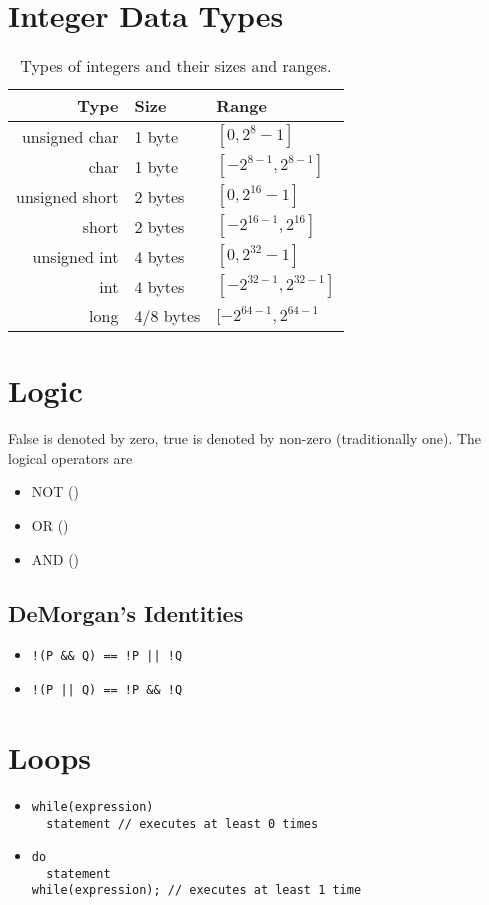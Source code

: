 \documentclass[12pt]{article}
\begin{document}
\section*{Integer Data Types}
\begin{table}[ht]
\centering
  \caption{Types of integers and their sizes and ranges.}
  \begin{tabular}{r|ll}
  Type & Size & Range \\ \hline
  unsigned char & 1 byte & $[0,2^8-1]$ \\
  char   & 1 byte & $[-2^{8-1},2^{8-1}]$ \\
  unsigned short & 2 bytes & $[0,2^{16}-1]$ \\
  short & 2 bytes & $[-2^{16-1},2^{16}]$ \\
  unsigned int & 4 bytes & $[0,2^{32}-1]$ \\
  int & 4 bytes & $[-2^{32-1},2^{32-1}]$ \\
  long & 4/8 bytes & $[-2^{64-1},2^{64-1}$ \\ \hline
  \end{tabular}
\end{table}

\section*{Logic}
False is denoted by zero, true is denoted by non-zero (traditionally one). The logical operators are
\begin{itemize}
\item NOT (\code{!})
\item OR (\code{||})
\item AND (\code{\&\&})
\end{itemize}

\subsection*{DeMorgan's Identities}
\begin{itemize}
\item \begin{verbatim}!(P && Q) == !P || !Q\end{verbatim}
\item \begin{verbatim}!(P || Q) == !P && !Q\end{verbatim}
\end{itemize}

\section*{Loops}
\begin{itemize}
\item \begin{verbatim}while(expression)
  statement // executes at least 0 times\end{verbatim}
\item \begin{verbatim}do
  statement
while(expression); // executes at least 1 time\end{verbatim}
\end{itemize}
\end{document}
